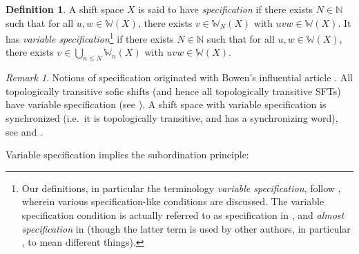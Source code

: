 \documentclass[reqno,11pt]{amsart}
\theoremstyle{definition}
\newtheorem{defn}[thm]{Definition}
\theoremstyle{remark}
\theoremstyle{remark}
\newtheorem{rem}[thm]{Remark}
\def \N {\mathbb N}
\def\w{\mathbb{W}}
\numberwithin{equation}{section}
\begin{document}
\begin{defn}\label{variable_specification_defn}
A shift space $X$ is said to have \emph{specification}
if there exists $N\in\N$ such that for all
$u,w\in \w(X)$, there exists $v\in \w_N(X)$ with $uvw\in\w(X)$.
It has \emph{variable specification}\footnote{Our definitions, in particular the terminology \emph{variable specification},
follow \cite{klo}, wherein various specification-like conditions are discussed. The variable specification condition is actually referred to as
specification in \cite{Ber88}, and
 \emph{almost specification} in \cite{jung}
(though the latter term
 is used by other authors, in particular \cite{thompson, yamamoto}, to mean different things).}
if there exists $N\in\N$ such that for all
$u,w\in \w(X)$, there exists $v\in \bigcup_{n\le N}\w_n(X)$ with $uvw\in\w(X)$.  
\end{defn}

\begin{rem}
Notions of specification originated with Bowen's influential article \cite{bowen}.
All topologically transitive sofic shifts (and hence all topologically transitive SFTs) have variable specification (see \cite{klo}).
A shift space with variable specification is synchronized (i.e.~it is topologically transitive, and has a synchronizing word),
see  \cite[Thm.~1]{Ber88}
and \cite[Lem.~3.1]{jung}. 
\end{rem}

Variable specification implies the subordination principle:
\end{document}
